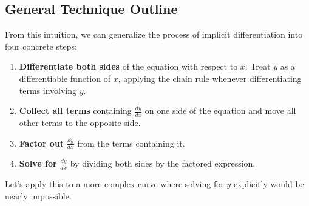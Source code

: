 \subsection*{General Technique Outline}
From this intuition, we can generalize the process of implicit differentiation into four concrete steps:
\begin{enumerate}
    \item \textbf{Differentiate both sides} of the equation with respect to $x$. Treat $y$ as a differentiable function of $x$, applying the chain rule whenever differentiating terms involving $y$.
    \item \textbf{Collect all terms} containing $\frac{dy}{dx}$ on one side of the equation and move all other terms to the opposite side.
    \item \textbf{Factor out} $\frac{dy}{dx}$ from the terms containing it.
    \item \textbf{Solve for} $\frac{dy}{dx}$ by dividing both sides by the factored expression.
\end{enumerate}

Let's apply this to a more complex curve where solving for $y$ explicitly would be nearly impossible.

